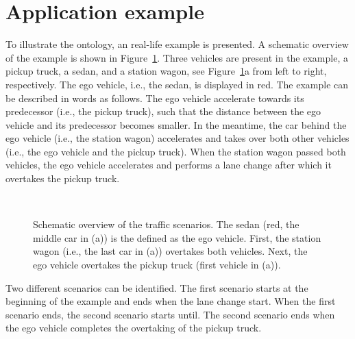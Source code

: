 \section{Application example}
\label{sec:example}

To illustrate the ontology, an real-life example is presented. A schematic overview of the example is shown in Figure~\ref{fig:example schematic}. Three vehicles are present in the example, a pickup truck, a sedan, and a station wagon, see Figure~\ref{fig:example schematic}a from left to right, respectively. The ego vehicle, i.e., the sedan, is displayed in red. The example can be described in words as follows. The ego vehicle accelerate towards its predecessor (i.e., the pickup truck), such that the distance between the ego vehicle and its predecessor becomes smaller. In the meantime, the car behind the ego vehicle (i.e., the station wagon) accelerates and takes over both other vehicles (i.e., the ego vehicle and the pickup truck). When the station wagon passed both vehicles, the ego vehicle accelerates and performs a lane change after which it overtakes the pickup truck.

\begin{figure}
	\centering
	\setlength\figureheight{106pt}
	\setlength\figurewidth{260pt}
	\\
	\setlength\figureheight{100pt}
	\caption{Schematic overview of the traffic scenarios. The sedan (red, the middle car in (a)) is the defined as the ego vehicle. First, the station wagon (i.e., the last car in (a)) overtakes both vehicles. Next, the ego vehicle overtakes the pickup truck (first vehicle in (a)).}
	\label{fig:example schematic}
\end{figure}

Two different scenarios can be identified. The first scenario starts at the beginning of the example and ends when the lane change start. When the first scenario ends, the second scenario starts until. The second scenario ends when the ego vehicle completes the overtaking of the pickup truck.

